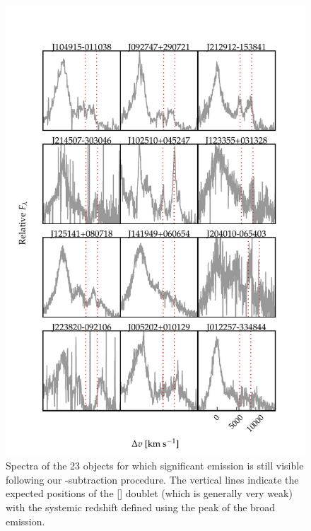 \begin{figure}
    \centering
    \includegraphics[width=\columnwidth]{figures/chapter04/example_spectrum_grid_extreme_fe_1.pdf} 
    \caption[{Spectra of the 24 objects for which significant  emission is still visible following our -subtraction procedure.}]{Spectra of the 23 objects for which significant  emission is still visible following our -subtraction procedure. The vertical lines indicate the expected positions of the [] doublet (which is generally very weak) with the systemic redshift defined using the peak of the broad \hb emission.}     
    \label{fig:bad_fe_1}
\end{figure}

